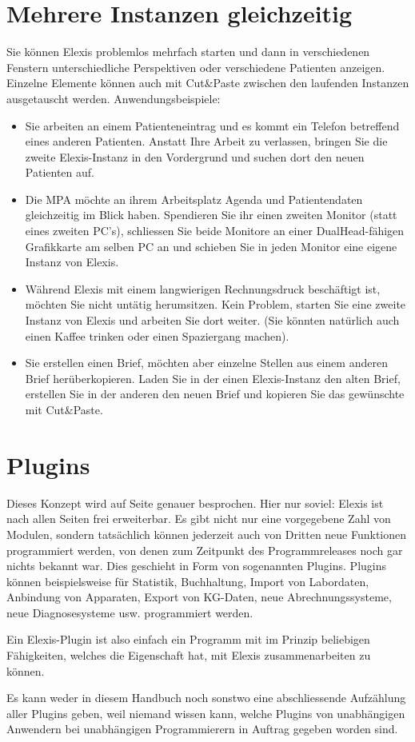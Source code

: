  \section{Mehrere Instanzen gleichzeitig}
 Sie können Elexis problemlos mehrfach starten und dann in verschiedenen
 Fenstern unterschiedliche Perspektiven oder verschiedene Patienten anzeigen.
 Einzelne Elemente können auch mit Cut\&Paste zwischen den laufenden Instanzen
 ausgetauscht werden.
 Anwendungsbeispiele:
 \begin{itemize}
   \item Sie arbeiten an einem Patienteneintrag und es kommt ein Telefon
   betreffend eines anderen Patienten. Anstatt Ihre Arbeit zu verlassen, bringen
   Sie die zweite Elexis-Instanz in den Vordergrund und suchen dort den neuen
   Patienten auf.
   \item Die MPA möchte an ihrem Arbeitsplatz Agenda und Patientendaten
   gleichzeitig im Blick haben. Spendieren Sie ihr einen zweiten Monitor (statt
   eines zweiten PC's), schliessen Sie beide Monitore an einer DualHead-fähigen
   Grafikkarte am selben PC an und schieben Sie in jeden Monitor eine eigene
   Instanz von Elexis.
   \item Während Elexis mit einem langwierigen Rechnungsdruck beschäftigt ist,
   möch\-ten Sie nicht untätig herumsitzen. Kein Problem, starten Sie eine zweite
   Instanz von Elexis und arbeiten Sie dort weiter. (Sie könnten natürlich auch
   einen Kaffee trinken oder einen Spaziergang machen).
   \item Sie erstellen einen Brief, möchten aber einzelne Stellen aus einem
   anderen Brief herüberkopieren. Laden Sie in der einen Elexis-Instanz den
   alten Brief, erstellen Sie in der anderen den neuen Brief und kopieren Sie
   das gewünschte mit Cut\&Paste.
 \end{itemize}

\section{Plugins}
Dieses Konzept wird auf Seite \pageref{expl:plugins} genauer besprochen. Hier nur soviel: Elexis ist nach allen Seiten frei erweiterbar. Es gibt nicht nur eine vorgegebene Zahl von \glqq Modulen\grqq{}, sondern tatsächlich können jederzeit auch von Dritten neue Funktionen programmiert werden, von denen zum Zeitpunkt des Programmreleases noch gar nichts bekannt war. Dies geschieht in Form von sogenannten \glqq Plugins\grqq{}. Plugins können beispielsweise für Statistik, Buchhaltung, Import von Labordaten, Anbindung von Apparaten, Export von KG-Daten, neue Abrechnungssysteme, neue Diagnosesysteme usw. programmiert werden.

Ein Elexis-Plugin ist also einfach ein Programm mit im Prinzip beliebigen Fähigkeiten, welches die Eigenschaft hat, mit Elexis zusammenarbeiten zu können.

Es kann weder in diesem Handbuch noch sonstwo eine abschliessende Aufzählung aller Plugins geben, weil niemand wissen kann, welche Plugins von unabhängigen Anwendern bei unabhängigen Programmierern in Auftrag gegeben worden sind. 